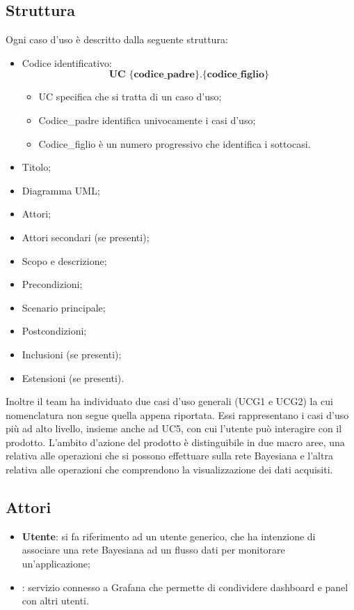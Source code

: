 \subsection{Struttura}
Ogni caso d'uso è descritto dalla seguente struttura:
\begin{itemize}
	\item Codice identificativo: $$ \textbf{UC \{codice\_padre\}.\{codice\_figlio\}  } $$
	\begin{itemize}
		\item UC specifica che si tratta di un caso d'uso;
		\item Codice\_padre identifica univocamente i casi d'uso;
		\item Codice\_figlio è un numero progressivo che identifica i sottocasi.
	\end{itemize}
	\item Titolo;
	\item Diagramma UML;
	\item Attori;
	\item Attori secondari (se presenti);
	\item Scopo e descrizione;
	\item Precondizioni;
	\item Scenario principale;
	\item Postcondizioni;
	\item Inclusioni (se presenti);
	\item Estensioni (se presenti).
\end{itemize}
\Spazio
Inoltre il team ha individuato due casi d'uso generali (UCG1 e UCG2) la cui nomenclatura non segue quella appena riportata. Essi rappresentano i casi d'uso più ad alto livello, insieme anche ad UC5, con cui l'utente può interagire con il prodotto.
L'ambito d'azione del prodotto è distinguibile in due macro aree, una relativa alle operazioni che si possono effettuare sulla rete Bayesiana e l'altra relativa alle operazioni che comprendono la visualizzazione dei dati acquisiti.

\subsection{Attori}
\begin{itemize}
	\item \textbf{Utente}: si fa riferimento ad un utente generico, che ha intenzione di associare una rete Bayesiana ad un flusso dati per monitorare un'applicazione;
	\item \textbf{}: servizio  connesso a Grafana che permette di condividere dashboard e panel con altri utenti.
\end{itemize}

